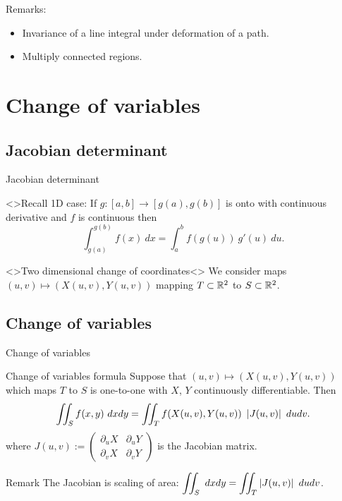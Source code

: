 {Remarks:}
\begin{itemize}
    \item     Invariance of a line integral under deformation of a path.
    \item Multiply connected regions.
\end{itemize}




\section{Change of variables}

\subsection{Jacobian determinant}


{Jacobian determinant}

<>{Recall 1D case:}
If \(g : [a,b] \to [g(a),g(b)]\) is onto with continuous derivative and \(f\) is continuous then
\[
    \int_{g(a)}^{g(b)}    f(x) \ dx = \int_{a}^{b} f(g(u)) \ g'(u) \ du.
\]

<>{Two dimensional change of coordinates}<>
We consider maps \((u,v) \mapsto (X(u,v),Y(u,v))\) mapping  \(T\subset \mathbb{R}^2\) to  \(S\subset \mathbb{R}^2\).






\subsection{Change of variables}


{Change of variables}

{Change of variables formula}
Suppose that \((u,v) \mapsto (X(u,v),Y(u,v))\) which maps \(T\) to \(S\) is one-to-one with \(X\), \(Y\) continuously differentiable. Then
\[
    \iint_{S} f(x,y) \ dxdy = \iint_{T} f(X(u,v),Y(u,v)) \ \abs{J(u,v)} \ dudv.
\]
where
\(J(u,v):= \begin{pmatrix}
    \partial_u X & \partial_u Y \\ \partial_v X & \partial_v Y
\end{pmatrix}\) is the Jacobian matrix.


    {Remark}
The Jacobian is scaling of area: \(\displaystyle\iint_{S} \ dx dy = \displaystyle\iint_{T}  \left|J(u,v)\right| \ dudv \).




